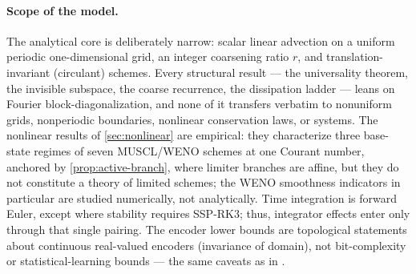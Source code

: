 \documentclass[pdflatex,sn-mathphys-num]{sn-jnl}%
\theoremstyle{thmstyleone}%
\theoremstyle{thmstyletwo}%
\theoremstyle{thmstylethree}%
\begin{document}
\paragraph{Scope of the model.}
The analytical core is deliberately narrow: scalar linear advection on a uniform periodic one-dimensional grid, an integer coarsening ratio $r$, and translation-invariant (circulant) schemes.
Every structural result --- the universality theorem, the invisible subspace, the coarse recurrence, the dissipation ladder --- leans on Fourier block-diagonalization, and none of it transfers verbatim to nonuniform grids, nonperiodic boundaries, nonlinear conservation laws, or systems.
The nonlinear results of \cref{sec:nonlinear} are empirical: they characterize three base-state regimes of seven MUSCL/WENO schemes at one Courant number, anchored by \cref{prop:active-branch}, where limiter branches are affine, but they do not constitute a theory of limited schemes; the WENO smoothness indicators in particular are studied numerically, not analytically.
Time integration is forward Euler, except where stability requires SSP-RK3; thus, integrator effects enter only through that single pairing.
The encoder lower bounds are topological statements about continuous real-valued encoders (invariance of domain), not bit-complexity or statistical-learning bounds --- the same caveats as in \cite{PolemitisChristakisDrikakis2026FVerasure}.
\end{document}
